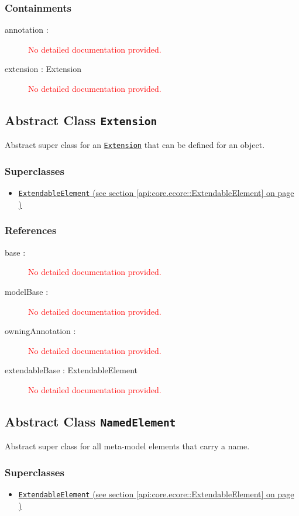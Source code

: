 \subsubsection*{Containments}
\begin{description}
\item[annotation : ] \textcolor{red}{No detailed documentation provided.}
\item[extension : Extension] \textcolor{red}{No detailed documentation provided.}
\end{description}
\subsection{Abstract Class \texttt{Extension}}
\label{api:core.ecore::Extension}
Abstract super class for an \hyperref[Extension]{\texttt{Extension}} that can be defined for an object.
\subsubsection*{Superclasses}
\begin{itemize}
\item \hyperref[api:core.ecore::ExtendableElement]{\texttt{ExtendableElement} (see section \ref*{api:core.ecore::ExtendableElement} on page \pageref*{api:core.ecore::ExtendableElement})}
\end{itemize}
\subsubsection*{References}
\begin{description}
\item[base : ] \textcolor{red}{No detailed documentation provided.}
\item[modelBase : ] \textcolor{red}{No detailed documentation provided.}
\item[owningAnnotation : ] \textcolor{red}{No detailed documentation provided.}
\item[extendableBase : ExtendableElement] \textcolor{red}{No detailed documentation provided.}
\end{description}
\subsection{Abstract Class \texttt{NamedElement}}
\label{api:core.ecore::NamedElement}
Abstract super class for all meta-model elements that carry a name. 
\subsubsection*{Superclasses}
\begin{itemize}
\item \hyperref[api:core.ecore::ExtendableElement]{\texttt{ExtendableElement} (see section \ref*{api:core.ecore::ExtendableElement} on page \pageref*{api:core.ecore::ExtendableElement})}
\end{itemize}
